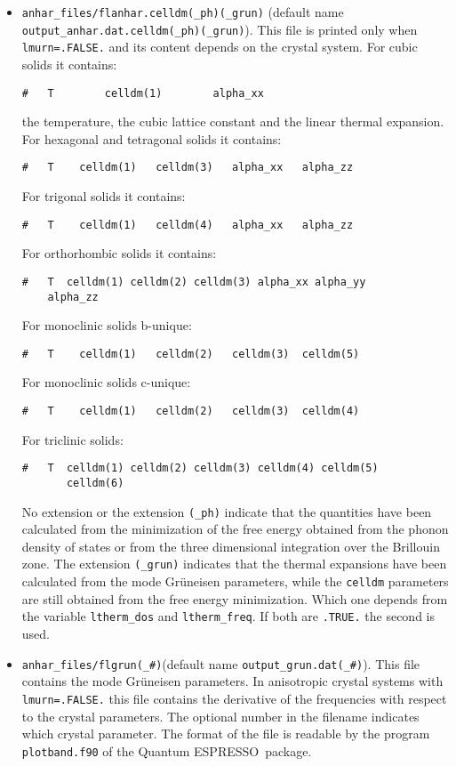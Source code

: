 \documentclass[12pt,a4paper,twoside]{report}
\def\qe{{\sc Quantum ESPRESSO}}
\begin{document}
\begin{itemize}
\item 
\texttt{anhar\_files/flanhar.celldm(\_ph)(\_grun)} 
(default name \\ \texttt{output\_anhar.dat.celldm(\_ph)(\_grun)}). 
This file is printed
only when \texttt{lmurn=.FALSE.} and its content depends on the crystal 
system. For cubic solids it contains: 
\begin{verbatim}
#   T        celldm(1)        alpha_xx
\end{verbatim}
the temperature, the cubic lattice constant and the linear thermal expansion.
For hexagonal and tetragonal solids it contains:
\begin{verbatim}
#   T    celldm(1)   celldm(3)   alpha_xx   alpha_zz
\end{verbatim}
For trigonal solids it contains:
\begin{verbatim}
#   T    celldm(1)   celldm(4)   alpha_xx   alpha_zz
\end{verbatim}
For orthorhombic solids it contains:
\begin{verbatim}
#   T  celldm(1) celldm(2) celldm(3) alpha_xx alpha_yy 
    alpha_zz
\end{verbatim}
For monoclinic solids b-unique:
\begin{verbatim}
#   T    celldm(1)   celldm(2)   celldm(3)  celldm(5)
\end{verbatim}
For monoclinic solids c-unique:
\begin{verbatim}
#   T    celldm(1)   celldm(2)   celldm(3)  celldm(4)
\end{verbatim}
For triclinic solids:
\begin{verbatim}
#   T  celldm(1) celldm(2) celldm(3) celldm(4) celldm(5) 
       celldm(6)
\end{verbatim}
No extension or the extension \texttt{(\_ph)} 
indicate that the quantities have been calculated from the minimization of
the free energy obtained from the phonon density of states or from the
three dimensional integration over the Brillouin zone. The extension
\texttt{(\_grun)} indicates that the thermal expansions have been
calculated from the mode Gr\"uneisen parameters, while the \texttt{celldm}
parameters are still obtained from the free energy minimization. Which
one depends from the variable \texttt{ltherm\_dos} and \texttt{ltherm\_freq}.
If both are \texttt{.TRUE.} the second is used.

\item 
\texttt{anhar\_files/flgrun(\_\#)}(default name 
\texttt{output\_grun.dat(\_\#)}). This file contains the mode Gr\"uneisen
parameters. In anisotropic crystal systems with \texttt{lmurn=.FALSE.} this
file contains the derivative of the frequencies with respect to the
crystal parameters. The optional number in the filename indicates which
crystal parameter. The format of the file is readable by the program
\texttt{plotband.f90} of the \qe\ package.


\end{itemize}
\end{document}

